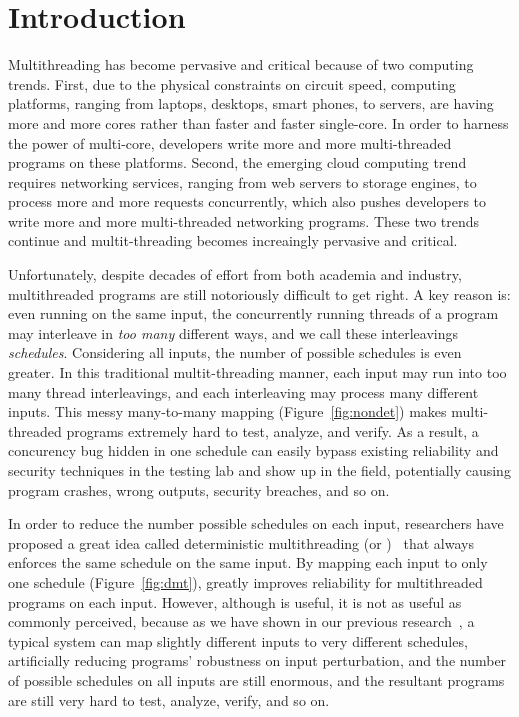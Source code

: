 \chapter{Introduction} \label{sec:intro}

Multithreading has become pervasive and critical because of two computing trends. First, due to the physical constraints on circuit speed, computing platforms, ranging from laptops, desktops, smart phones, to servers, are having more and more cores rather than faster and faster single-core. In order to 
harness the power of multi-core, developers write more and more multi-threaded programs on these platforms. Second, the emerging cloud computing trend requires networking services, ranging from 
web servers to storage engines, to process more and more requests concurrently, which also pushes developers to write more and more multi-threaded networking programs. These two trends continue and 
multit-threading becomes increaingly pervasive and critical.

Unfortunately, despite decades of effort from both academia and industry, multithreaded programs are still notoriously difficult to get right. A key reason is: even running on the same input, the concurrently running threads of a program may interleave in \emph{too many} different ways, and we call these interleavings \emph{schedules}. Considering all inputs, the number of possible schedules is even greater. 
In this traditional multit-threading manner, each input may run into too many thread interleavings, and each interleaving may process many different inputs. This messy many-to-many mapping (Figure~\ref{fig:nondet}) makes multi-threaded programs extremely hard to test, analyze, and verify. As a result, a concurency bug hidden in one schedule can easily bypass existing reliability and security techniques in the testing lab and show up in the field, potentially causing program crashes, wrong outputs, security breaches, and so on.

In order to reduce the number possible schedules on each input, researchers have proposed a great idea called deterministic multithreading (or \dmt)~\cite{dthreads:sosp11, dpj:oopsla09, dmp:asplos09, kendo:asplos09, coredet:asplos10} that always enforces the same schedule on the same input. By mapping each input to only one schedule (Figure~\ref{fig:dmt}), \dmt greatly improves reliability for multithreaded programs on each input. However, although \dmt is useful, it is not as useful as commonly perceived, because as we have shown in our previous research~\cite{cui:tern:osdi10}, a typical \dmt system can map slightly different inputs to very different schedules, artificially reducing programs' robustness on input perturbation, and the number of possible schedules on all inputs are still enormous, and the resultant programs are still very hard to test, analyze, verify, and so on.


